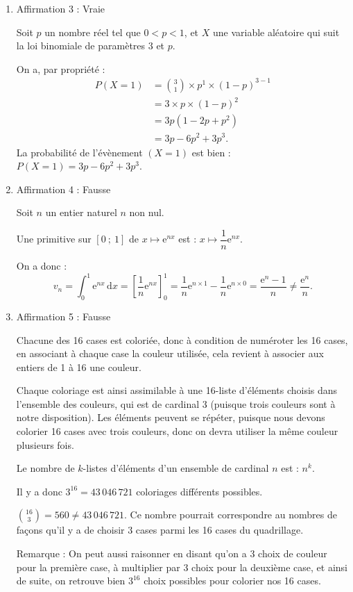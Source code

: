 \documentclass[10pt]{article}
\providecommand{\N}{\mathbb{N}}
\providecommand{\e}{{\mathrm{e}}}
\begin{document}
\begin{enumerate}
\begin{itemize}
\item Conclusion : On a montré que l'affirmation $P_0$ est vraie, et que pour un $n$ entier naturel, si $P_n$ est vraie, alors $P_{n+1}$ est vraie.
\end{itemize}

En vertu du principe de récurrence, on en déduit que, pour tout entier naturel $n$, l'affirmation est vraie, et donc on a établi une expression explicite du terme général de la suite $(w_n)$ :
\[
\forall n\in\N,\quad w_n=(n+1)^2.
\]

\item Affirmation 3 : Vraie

Soit $p$ un nombre réel tel que $0<p<1$, et $X$ une variable aléatoire qui suit la loi binomiale de paramètres 3 et $p$.

On a, par propriété :
\[
\begin{aligned}
P(X=1)&=\binom31\times p^1\times (1-p)^{3-1}\\
&=3\times p\times (1-p)^2\\
&=3p(1-2p+p^2)\\
&=3p-6p^2+3p^3.
\end{aligned}
\]
La probabilité de l'évènement $(X=1)$ est bien : $P(X=1)=3p-6p^2+3p^3$.

\item Affirmation 4 : Fausse

Soit $n$ un entier naturel $n$ non nul.

Une primitive sur $[0~;~1]$ de $x\longmapsto \e^{nx}$ est : $x\longmapsto \dfrac1n\e^{nx}$.

On a donc :
\[
v_n=\int_0^1 \e^{nx}\,\mathrm{d}x=\left[\dfrac1n\e^{nx}\right]_0^1=\dfrac1n\e^{n\times 1}-\dfrac1n\e^{n\times 0}=\dfrac{\e^n-1}{n}\neq \dfrac{\e^n}{n}.
\]

\item Affirmation 5 : Fausse

Chacune des 16 cases est coloriée, donc à condition de numéroter les 16 cases, en associant à chaque case la couleur utilisée, cela revient à associer aux entiers de 1 à 16 une couleur.

Chaque coloriage est ainsi assimilable à une 16-liste d'éléments choisis dans l'ensemble des couleurs, qui est de cardinal 3 (puisque trois couleurs sont à notre disposition). Les éléments peuvent se répéter, puisque nous devons colorier 16 cases avec trois couleurs, donc on devra utiliser la même couleur plusieurs fois.

Le nombre de $k$-listes d'éléments d'un ensemble de cardinal $n$ est : $n^k$.

Il y a donc $3^{16}=43\,046\,721$ coloriages différents possibles.

$\binom{16}{3}=560\neq 43\,046\,721$. Ce nombre pourrait correspondre au nombres de façons qu'il y a de choisir 3 cases parmi les 16 cases du quadrillage.

Remarque : On peut aussi raisonner en disant qu'on a 3 choix de couleur pour la première case, à multiplier par 3 choix pour la deuxième case, et ainsi de suite, on retrouve bien $3^{16}$ choix possibles pour colorier nos 16 cases.
\end{enumerate}
\end{document}
